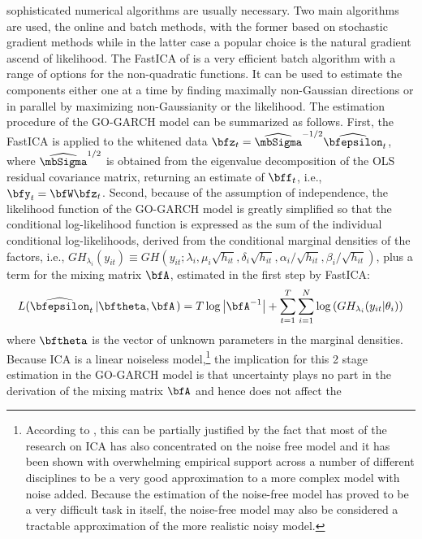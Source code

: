 sophisticated numerical algorithms are usually necessary. Two main algorithms are used,
the online and batch methods, with the former based on stochastic gradient methods
while in the latter case a popular choice is the natural gradient ascend of likelihood.
The FastICA of \cite{Hyvaerinen2000} is a very efficient batch algorithm with
a range of options for the non-quadratic functions. It can be used to estimate
the components either one at a time by finding maximally non-Gaussian directions
or in parallel by maximizing non-Gaussianity or the likelihood. The estimation
procedure of the GO-GARCH model can be summarized as follows. First, the FastICA
is applied to the whitened data \( \bfz_t = \widehat{\mbSigma}^{-1/2}\widehat{\bfepsilon}_t \),
where \( \widehat{\mbSigma}^{1/2} \) is obtained from the eigenvalue decomposition
of the OLS residual covariance matrix, returning an estimate of \( \bff_t\), i.e.,
\(\bfy_t = \bfW \bfz_t\). Second, because of the assumption of independence, the
likelihood function of the GO-GARCH model is greatly simplified so that the conditional
log-likelihood function is expressed as the sum of the individual conditional
log-likelihoods, derived from the conditional marginal densities of the factors,
i.e., $GH_{\lambda_i}(y_{it})\equiv GH(y_{it};\lambda_i,\mu_{i}\sqrt{h_{it}},\delta_{i}\sqrt{h_{it}},\alpha_{i}/\sqrt{h_{it}},\beta_{i}/\sqrt{h_{it}})$,
plus a term for the mixing matrix \(\bfA\), estimated in the first step by FastICA:
\begin{equation}\label{eq:log_lik_IFACD}
L(\widehat{\bfepsilon} _t \left| \bftheta ,\bfA \right.) = T \log{\left| \bfA^{ - 1} \right|} +
\sum\limits_{t = 1}^T \sum\limits_{i = 1}^N \log{\left(GH_{\lambda_i}(y_{it}|\theta_i)\right)}
\end{equation}
where \( \bftheta \) is the vector of unknown parameters in the marginal densities.
Because ICA is a linear noiseless model,\footnote{According to \cite{Hyvaerinen2000},
this can be partially justified by the fact that most of the research on ICA has also
concentrated on the noise free model and it has been shown with overwhelming empirical
support across a number of different disciplines to be a very good approximation to
a more complex model with noise added. Because the estimation of the noise-free model
has proved to be a very difficult task in itself, the noise-free model may also be
considered a tractable approximation of the more realistic noisy model.} the implication
for this 2 stage estimation in the GO-GARCH model is that uncertainty plays no part
in the derivation of the mixing matrix \(\bfA\) and hence does not affect the
